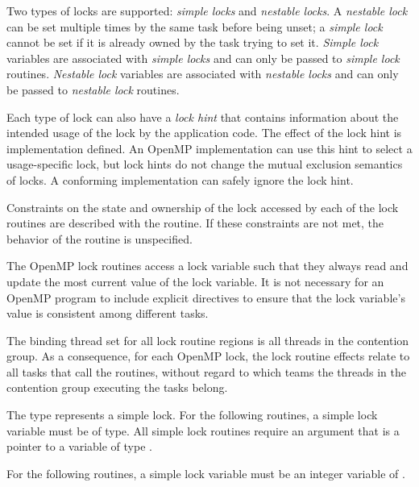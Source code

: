 Two types of locks are supported: \emph{simple locks} and \emph{nestable locks}. A \emph{nestable lock} can 
be set multiple times by the same task before being unset; a \emph{simple lock} cannot be set if 
it is already owned by the task trying to set it. \emph{Simple lock} variables are associated with 
\emph{simple locks} and can only be passed to \emph{simple lock} routines. \emph{Nestable lock} variables are 
associated with \emph{nestable locks} and can only be passed to \emph{nestable lock} routines.

Each type of lock can also have a \emph{lock hint} that contains information about the intended usage 
of the lock by the application code.  The effect of the lock hint is
implementation defined.  An OpenMP implementation can use this hint to select a
usage-specific lock, but lock hints do not change the mutual exclusion semantics of locks. 
A conforming implementation can safely ignore the lock hint.

Constraints on the state and ownership of the lock accessed by each of the lock routines 
are described with the routine. If these constraints are not met, the behavior of the 
routine is unspecified. 

The OpenMP lock routines access a lock variable such that they always read 
and update the most current value of the lock variable. It is not necessary for an 
OpenMP program to include explicit  directives to ensure that the lock variable's 
value is consistent among different tasks. 

\vspace{-8pt}

\binding
The binding thread set for all lock routine regions is all threads in the contention group. 
As a consequence, for each OpenMP lock, the lock routine effects relate to all tasks that 
call the routines, without regard to which teams the threads in the contention group 
executing the tasks belong.


\vspace{-8pt}

\ccppspecificstart
The type  represents a simple lock. For the 
following routines, a simple lock variable must be of  type. All simple 
lock routines require an argument that is a pointer to a variable of type .
\ccppspecificend

\fortranspecificstart
For the following routines, a simple lock variable must be an integer variable of 
.
\fortranspecificend

